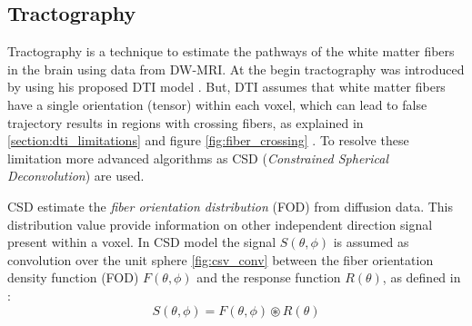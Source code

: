  \subsection{Tractography}
 Tractography is a technique to estimate the pathways of the white matter fibers in the brain using data from DW-MRI. At the begin tractography was introduced by \cite{basser1998fiber} using his proposed DTI model \cite{basser1994mr} \cite{basser2011microstructural}. But, DTI assumes that white matter fibers have a single orientation (tensor) within each voxel, which can lead to false trajectory results in regions with crossing fibers, as explained in \ref{section:dti_limitations} and figure \ref{fig:fiber_crossing} \cite{basser2000vivo}. To resolve these limitation more advanced algorithms as CSD (\emph{Constrained Spherical Deconvolution}) \cite{tournier2007robust} are used.

 CSD estimate the \emph{fiber orientation distribution} (FOD) from diffusion data. This distribution value provide information on other independent direction signal present within a voxel. In CSD model the signal $S(\theta, \phi)$ is assumed as convolution over the unit sphere \ref{fig:csv_conv} between the fiber orientation density function (FOD) $F(\theta, \phi)$ and the response function $R(\theta)$, as defined in \cite{tournier2004direct}: 
 \begin{equation}
   S(\theta, \phi) = F(\theta, \phi) \circledast R(\theta)
 \end{equation}

